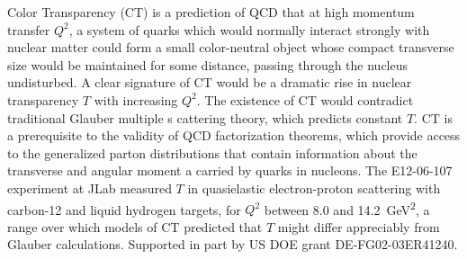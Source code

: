 \noindent
Color Transparency (CT) is a prediction of QCD that at high momentum transfer
$Q ^2$, a system of quarks which would normally interact strongly with nuclear
matter could form a small color-neutral object whose compact transverse size
would be maintained for some distance, passing through the nucleus undisturbed.
A clear signature of CT would be a dramatic rise in nuclear transparency $T$
with increasing $Q^2$. The existence of CT would contradict traditional Glauber
multiple s cattering theory, which predicts constant $T$. CT is a prerequisite
to the validity of QCD factorization theorems, which provide access to the
generalized parton distributions that contain information about the transverse
and angular moment a carried by quarks in nucleons. The E12-06-107 experiment
at JLab measured $T$ in quasielastic electron-proton scattering with carbon-12
and liquid hydrogen targets, for $Q^2$ between 8.0 and
\SI{14.2}{\giga\electronvolt\squared}, a range over which models of CT
predicted that $T$ might differ appreciably from Glauber calculations.
Supported in part by US DOE grant DE-FG02-03ER41240.
